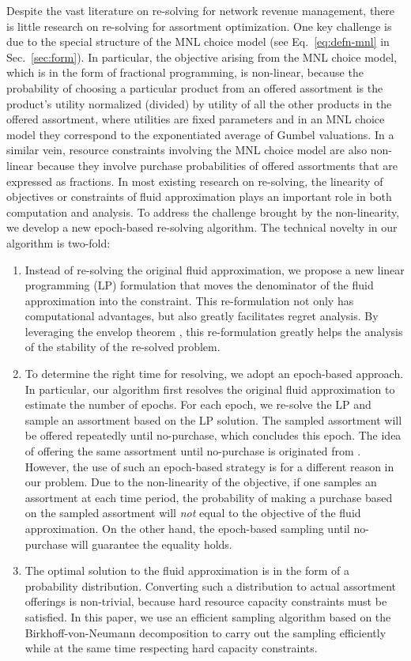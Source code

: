 \documentclass[opre]{informs3aa}
\begin{document}
Despite the vast literature on re-solving for network revenue management, there is little research on re-solving for assortment optimization. One key challenge is due to the special structure of the MNL choice model (see Eq.~\eqref{eq:defn-mnl} in Sec.~\ref{sec:form}). 
{In particular, the objective arising from the MNL choice model, which is in the form of fractional programming, is non-linear,
because the probability of choosing a particular product from an offered assortment is the product's utility normalized (divided) by utility of all the other products in the offered assortment,
{where utilities are fixed parameters and in an MNL choice model they correspond to the exponentiated average of Gumbel valuations.}
In a similar vein, resource constraints involving the MNL choice model are also non-linear because they involve purchase probabilities of offered assortments that are expressed as fractions. }
In most existing research on re-solving, the linearity of objectives or constraints of fluid approximation plays an important role in both computation and analysis. To address the challenge brought by the non-linearity, we develop a new epoch-based re-solving algorithm. The technical novelty in our algorithm is two-fold:
\begin{enumerate}
\item Instead of re-solving the original fluid approximation, we propose a new linear programming (LP) formulation that moves the denominator of the fluid approximation into the constraint. This re-formulation not only has computational advantages, but also greatly facilitates regret analysis. By leveraging the envelop theorem \citep{milgrom2002envelope,tercca2020envelope}, this re-formulation greatly helps the analysis of the stability of the re-solved problem.

\item To determine the right time for resolving, we adopt an epoch-based approach. In particular, our algorithm first resolves the original fluid approximation to estimate the number of epochs. For each epoch, we re-solve the LP and sample an assortment based on the LP solution. The sampled assortment will be offered repeatedly until no-purchase, which concludes this epoch.
The idea of offering the same assortment until no-purchase is originated from \cite{agrawal2019mnl}. However, the use of such an epoch-based strategy is for a different reason in our problem. Due to the non-linearity of the objective, if one samples an assortment at each time period,  the probability of making a purchase based on the sampled assortment will \emph{not} equal to the objective of the fluid approximation. On the other hand, the epoch-based sampling until no-purchase will guarantee the equality holds.

\item The optimal solution to the fluid approximation is in the form of a probability distribution. Converting such a distribution to actual assortment offerings is non-trivial, because hard 
resource capacity constraints must be satisfied. In this paper, we use an efficient sampling algorithm based on the Birkhoff-von-Neumann decomposition to carry out the sampling
efficiently while at the same time respecting hard capacity constraints.
\end{enumerate}
\end{document}
